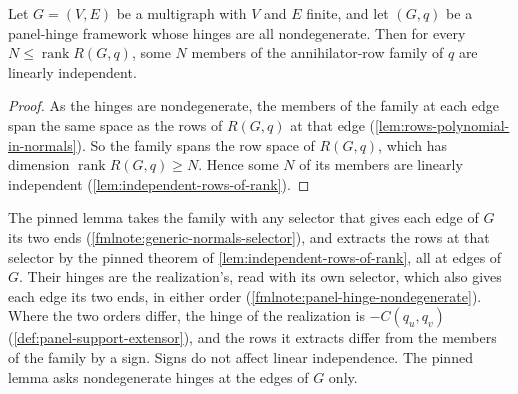 \begin{lemma}
  \label{lem:panel-witness-transplant}
  \leanok
  Let $G = (V, E)$ be a multigraph with $V$ and $E$ finite, and let
  $(G, q)$ be a panel-hinge framework whose hinges are all
  nondegenerate. Then for every $N \le \operatorname{rank} R(G, q)$,
  some $N$ members of the annihilator-row family of $q$ are linearly
  independent.
\end{lemma}
\begin{proof}
  \leanok
  As the hinges are nondegenerate, the members of the family at each
  edge span the same space as the rows of $R(G, q)$ at that edge
  (\cref{lem:rows-polynomial-in-normals}). So the family spans the row
  space of $R(G, q)$, which has dimension
  $\operatorname{rank} R(G, q) \ge N$. Hence some $N$ of its members
  are linearly independent (\cref{lem:independent-rows-of-rank}).
\end{proof}

\begin{fmlnote}
  The pinned lemma takes the family with any selector that gives each
  edge of $G$ its two ends (\cref{fmlnote:generic-normals-selector}),
  and extracts the rows at that selector by the pinned theorem of
  \cref{lem:independent-rows-of-rank}, all at edges of $G$. Their
  hinges are the realization's, read with its own selector, which also
  gives each edge its two ends, in either order
  (\cref{fmlnote:panel-hinge-nondegenerate}). Where the two orders
  differ, the hinge of the realization is $-C(q_u, q_v)$
  (\cref{def:panel-support-extensor}), and the rows it extracts differ
  from the members of the family by a sign. Signs do not affect linear
  independence. The pinned lemma asks nondegenerate hinges at the edges
  of $G$ only.
\end{fmlnote}

